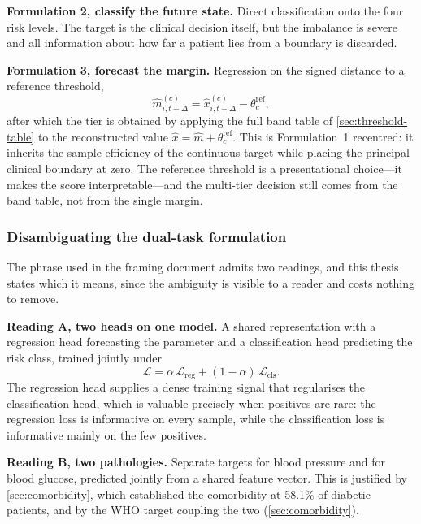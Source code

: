 \documentclass[12pt,a4paper,oneside]{report}
\begin{document}
\textbf{Formulation 2, classify the future state.} Direct classification onto the four risk levels. The target is the clinical decision itself, but the imbalance is severe and all information about how far a patient lies from a boundary is discarded.

\textbf{Formulation 3, forecast the margin.} Regression on the signed distance to a reference threshold,
\begin{equation}
  \hat{m}^{(c)}_{i,t+\Delta} = \hat{x}^{(c)}_{i,t+\Delta} - \theta_c^{\text{ref}},
\end{equation}
after which the tier is obtained by applying the full band table of \cref{sec:threshold-table} to the reconstructed value $\hat{x} = \hat{m} + \theta_c^{\text{ref}}$. This is Formulation~1 recentred: it inherits the sample efficiency of the continuous target while placing the principal clinical boundary at zero. The reference threshold is a presentational choice---it makes the score interpretable---and the multi-tier decision still comes from the band table, not from the single margin.

\subsubsection{Disambiguating the dual-task formulation}\label{sec:dual-task}

The phrase used in the framing document admits two readings, and this thesis states which it means, since the ambiguity is visible to a reader and costs nothing to remove.

\textbf{Reading A, two heads on one model.} A shared representation with a regression head forecasting the parameter and a classification head predicting the risk class, trained jointly under
\begin{equation}
  \mathcal{L} = \alpha\,\mathcal{L}_{\text{reg}} + (1-\alpha)\,\mathcal{L}_{\text{cls}}.
\end{equation}
The regression head supplies a dense training signal that regularises the classification head, which is valuable precisely when positives are rare: the regression loss is informative on every sample, while the classification loss is informative mainly on the few positives.

\textbf{Reading B, two pathologies.} Separate targets for blood pressure and for blood glucose, predicted jointly from a shared feature vector. This is justified by \cref{sec:comorbidity}, which established the comorbidity at 58.1\% of diabetic patients, and by the WHO target coupling the two (\cref{sec:comorbidity}).
\end{document}
